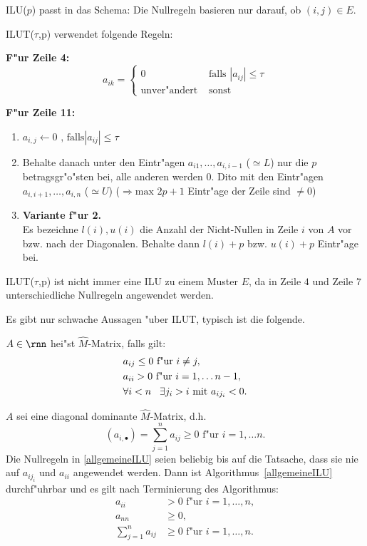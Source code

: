 \begin{bem}
ILU($p$) passt in das Schema: Die Nullregeln basieren nur darauf, ob $(i,j) \in E$.
\end{bem}

\begin{defn}
ILUT($\tau$,p) verwendet folgende Regeln:
\end{defn}

{\bf F"ur Zeile 4:}
$$
a_{ik} =
\begin{cases}
 0 &\text{falls } |a_{ij}| \leq \tau\\
 \text{unver"andert } & \text{sonst}
\end{cases}
$$

{\bf F"ur Zeile 11:}
\begin{enumerate}
\item $a_{i,j} \leftarrow 0 \text{ , falls} |a_{ij}| \leq \tau$
\item Behalte danach unter den Eintr"agen $a_{i1},\dots,a_{i,i-1}$ ($\simeq L$) nur die $p$ betragsgr"o"sten bei,
      alle anderen werden $0$. Dito mit den Eintr"agen $a_{i,i+1},\dots,a_{i,n}$
    ($\simeq U$)
      ($\Rightarrow \text{max } 2p+1$ Eintr"age der Zeile sind $\neq 0$)
\item[] {\bf Variante f"ur 2.}\\
Es bezeichne $l(i),u(i)$ die Anzahl der Nicht-Nullen in Zeile $i$ von $A$ vor bzw. nach der Diagonalen. Behalte dann
$l(i)+p$ bzw. $u(i) + p$ Eintr"age bei.
\end{enumerate}


\begin{bem}
ILUT($\tau$,p) ist nicht immer eine ILU zu einem Muster $E$, da in Zeile $4$ und Zeile $7$ unterschiedliche
Nullregeln angewendet werden.
\end{bem}
Es gibt nur schwache Aussagen "uber ILUT, typisch ist die folgende.

\begin{defn}
$A \in \rnn$ hei"st $\hat{M}$-Matrix, falls gilt:
\begin{align*}
& a_{ij}  \leq 0 \text{ f"ur } i\neq j,\\
& a_{ii}   > 0  \text{ f"ur } i = 1, \dots n-1, \\
& \forall i < n \hspace{0.3cm} \exists j_i > i \text{ mit }  a_{ij_i} < 0.
\end{align*}
\end{defn}

\begin{sa}
$A$ sei eine diagonal dominante $\hat{M}$-Matrix, d.h.
$$
(a_{i,\bullet}) = \sum_{j=1}^n a_{ij} \geq 0 \text{ f"ur } i = 1,\dots n.
$$
Die Nullregeln in \ref{allgemeineILU} seien beliebig bis auf die Tatsache, dass sie nie auf $a_{i j_i}$ und $a_{ii}$ angewendet werden. 
Dann ist Algorithmus~\ref{allgemeineILU} durchf"uhrbar und es gilt nach Terminierung des Algorithmus:
\begin{align*}
a_{ii} & > 0 \text{ f"ur } i = 1,\dots ,n,\\
a_{nn} & \geq 0, \\
\sum_{j=1}^n a_{ij} & \geq 0 \text{ f"ur } i = 1,\dots ,n. \\
\end{align*}
\end{sa}

